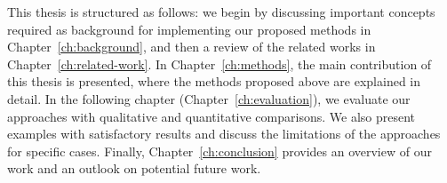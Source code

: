 This thesis is structured as follows: we begin by discussing important concepts required as background for implementing our proposed methods in Chapter~\ref{ch:background}, and then a review of the related works in Chapter~\ref{ch:related-work}. In Chapter~\ref{ch:methods}, the main contribution of this thesis is presented, where the methods proposed above are explained in detail. In the following chapter (Chapter~\ref{ch:evaluation}), we evaluate our approaches with qualitative and quantitative comparisons. We also present examples with satisfactory results and discuss the limitations of the approaches for specific cases. Finally, Chapter~\ref{ch:conclusion} provides an overview of our work and an outlook on potential future work.